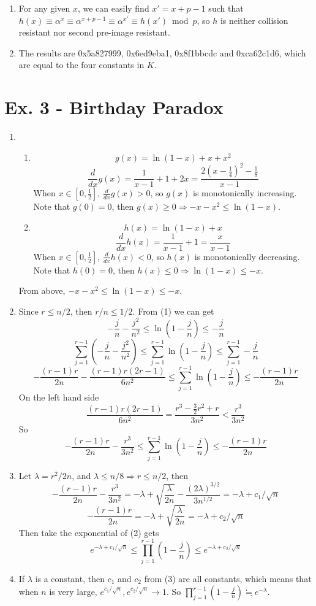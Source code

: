 \documentclass[12pt]{article}
\begin{document}
	\begin{enumerate}
		\item
			For any given $x$, we can easily find $x'=x+p-1$ such that $h(x)\equiv \alpha^x\equiv\alpha^{x+p-1}\equiv\alpha^{x'}\equiv h(x')\bmod p$, so $h$ is neither collision resistant nor second pre-image resistant.
		\item
			The results are 0x5a827999, 0x6ed9eba1, 0x8f1bbcdc and 0xca62c1d6, which are equal to the four constants in $K$.
	\end{enumerate}

\section*{Ex. 3 - Birthday Paradox}

	\begin{enumerate}
		\item
			\begin{enumerate}
				\item
					$$g(x)=\ln(1-x)+x+x^2$$
					$$\frac{d}{dx}g(x)=\frac{1}{x-1}+1+2x=\frac{2(x-\frac{1}{4})^2-\frac{1}{8}}{x-1}$$
					When $x\in[0,\frac{1}{2}]$, $\frac{d}{dx}g(x)>0$, so $g(x)$ is monotonically increasing. Note that $g(0)=0$, then $g(x)\geq0\Rightarrow-x-x^2\leq\ln(1-x)$.
				\item
					$$h(x)=\ln(1-x)+x$$
					$$\frac{d}{dx}h(x)=\frac{1}{x-1}+1=\frac{x}{x-1}$$
					When $x\in[0,\frac{1}{2}]$, $\frac{d}{dx}h(x)<0$, so $h(x)$ is monotonically decreasing. Note that $h(0)=0$, then $h(x)\leq0\Rightarrow\ln(1-x)\leq-x$.
			\end{enumerate}
			From above, $-x-x^2\leq\ln(1-x)\leq-x$.
		\item
			Since $r\leq n/2$, then $r/n\leq1/2$. From (1) we can get
			$$-\frac{j}{n}-\frac{j^2}{n^2}\leq\ln(1-\frac{j}{n})\leq-\frac{j}{n}$$
			$$\sum_{j=1}^{r-1}(-\frac{j}{n}-\frac{j^2}{n^2})\leq\sum_{j=1}^{r-1}\ln(1-\frac{j}{n})\leq\sum_{j=1}^{r-1}-\frac{j}{n}$$
			$$-\frac{(r-1)r}{2n}-\frac{(r-1)r(2r-1)}{6n^2}\leq\sum_{j=1}^{r-1}\ln(1-\frac{j}{n})\leq-\frac{(r-1)r}{2n}$$
			On the left hand side
			$$\frac{(r-1)r(2r-1)}{6n^2}=\frac{r^3-\frac{3}{2}r^2+r}{3n^2}<\frac{r^3}{3n^2}$$
			So
			$$-\frac{(r-1)r}{2n}-\frac{r^3}{3n^2}\leq\sum_{j=1}^{r-1}\ln(1-\frac{j}{n})\leq-\frac{(r-1)r}{2n}$$
		\item
			Let $\lambda=r^2/2n$, and $\lambda\leq n/8\Rightarrow r\leq n/2$, then
			$$-\frac{(r-1)r}{2n}-\frac{r^3}{3n^2}=-\lambda+\sqrt{\frac{\lambda}{2n}}-\frac{(2\lambda)^{3/2}}{3n^{1/2}}=-\lambda+c_1/\sqrt{n}$$
			$$-\frac{(r-1)r}{2n}=-\lambda+\sqrt{\frac{\lambda}{2n}}=-\lambda+c_2/\sqrt{n}$$
			Then take the exponential of (2) gets
			$$e^{-\lambda+c_1/\sqrt{n}}\leq\prod_{j=1}^{r-1}(1-\frac{j}{n})\leq e^{-\lambda+c_2/\sqrt{n}}$$
		\item
			If $\lambda$ is a constant, then $c_1$ and $c_2$ from (3) are all constants, which means that when $n$ is very large, $e^{c_1/\sqrt{n}},e^{c_2/\sqrt{n}}\rightarrow1$. So $\prod_{j=1}^{r-1}(1-\frac{j}{n})\fallingdotseq e^{-\lambda}$.
	\end{enumerate}
\end{document}
